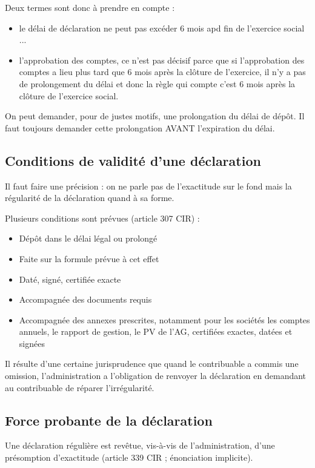 \documentclass{book}
\begin{document}
Deux termes sont donc à prendre en compte : 
\begin{itemize}
\item le délai de déclaration ne peut pas excéder 6 mois apd fin de l’exercice social ... 
\item l’approbation des comptes, ce n’est pas décisif parce que si l’approbation des comptes a lieu plus tard que 6 mois après la clôture de l’exercice, il n’y a pas de prolongement du délai et donc la règle qui compte c’est 6 mois après la clôture de l’exercice social. 
\end{itemize}

On peut demander, pour de justes motifs, une prolongation du délai de dépôt. Il faut toujours demander cette prolongation AVANT l’expiration du délai. 

\subsection{Conditions de validité d’une déclaration}
 
Il faut faire une précision : on ne parle pas de l’exactitude sur le fond mais la régularité de la déclaration quand à sa forme. 

Plusieurs conditions sont prévues (article 307 CIR) : 
\begin{itemize}
\item Dépôt dans le délai légal ou prolongé 
\item Faite sur la formule prévue à cet effet 
\item Daté, signé, certifiée exacte 
\item Accompagnée des documents requis  
\item Accompagnée des annexes prescrites, notamment pour les sociétés les comptes annuels, le rapport de gestion, le PV de l’AG, certifiées exactes, datées et signées
\end{itemize}

Il résulte d’une certaine jurisprudence que quand le contribuable a commis une omission, l’administration a l’obligation de renvoyer la déclaration en demandant au contribuable de réparer l’irrégularité. 

\subsection{Force probante de la déclaration}

Une déclaration régulière est revêtue, vis-à-vis de l’administration, d’une présomption d’exactitude (article 339 CIR ; énonciation implicite). 
\end{document}
